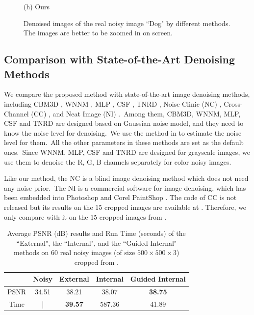\documentclass[10pt,twocolumn,letterpaper]{article}
\begin{document}
\begin{figure}
{\begin{minipage}[t]{0.244\textwidth}
{\footnotesize (h) Ours  }
\end{minipage}
}
\vspace{-3mm}
\caption{Denoised images of the real noisy image ``Dog" \cite{ncwebsite} by different methods. The images are better to be zoomed in on screen.}
\vspace{-1mm}
\label{fig6}
\end{figure}


\subsection{Comparison with State-of-the-Art Denoising Methods}


We compare the proposed method with state-of-the-art image denoising methods, including CBM3D \cite{bm3d,cbm3d}, WNNM \cite{wnnm}, MLP \cite{mlp}, CSF \cite{csf}, TNRD \cite{chen2015learning}, Noise Clinic (NC) \cite{noiseclinic}, Cross-Channel (CC) \cite{crosschannel2016}, and Neat Image (NI) \cite{neatimage}.\ Among them, CBM3D, WNNM, MLP, CSF and TNRD are designed based on Gaussian noise model, and they need to know the noise level for denoising.\ We use the method in \cite{noiselevel} to estimate the noise level for them.\ All the other parameters in these methods are set as the default ones.\ Since WNNM, MLP, CSF and TNRD are designed for grayscale images, we use them to denoise the R, G, B channels separately for color noisy images. 

Like our method, the NC is a blind image denoising method which does not need any noise prior.\ The NI is a commercial software for image denoising, which has been embedded into Photoshop and Corel PaintShop \cite{neatimage}. The code of CC is not released but its results on the 15 cropped images are available at \cite{crosschannel2016}. Therefore, we only compare with it on the 15 cropped images from \cite{crosschannel2016}. 

\begin{table}
\caption{Average PSNR (dB) results and Run Time (seconds) of the ``External", the ``Internal", and the ``Guided Internal" methods on 60 real noisy images (of size $500\times500\times3$) cropped from \cite{crosschannel2016}.}
\label{tab1}
\begin{small}
\vspace{-3mm}
\begin{center}
\renewcommand\arraystretch{1}
\begin{tabular}{|c||c|c|c|c|}
\hline
 & \textbf{Noisy} & \textbf{External} & \textbf{Internal} & \textbf{Guided Internal}  
\\
\hline
PSNR & 34.51 & 38.21 & 38.07 & \textbf{38.75} 
\\
\hline
Time & | &  \textbf{39.57}  & 587.36 & 41.89
\\
\hline
\end{tabular}
\end{center}\vspace{-4mm}
\end{small}
\end{table}
\end{document}
